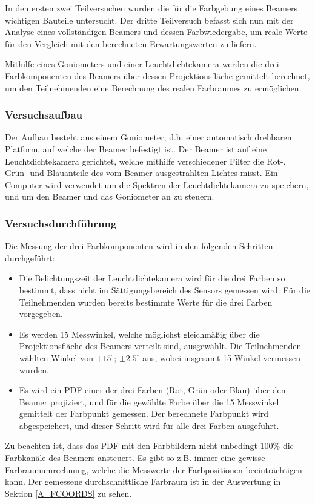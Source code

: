 
In den ersten zwei Teilversuchen wurden die für die Farbgebung eines Beamers wichtigen Bauteile untersucht. Der dritte Teilversuch befasst sich nun mit der Analyse eines vollständigen Beamers und dessen Farbwiedergabe, um reale Werte für den Vergleich mit den berechneten Erwartungswerten zu liefern.

Mithilfe eines Goniometers und einer Leuchtdichtekamera werden die drei Farbkomponenten des Beamers über dessen Projektionsfläche gemittelt berechnet, um den Teilnehmenden eine Berechnung des realen Farbraumes zu ermöglichen.

\subsubsection{Versuchsaufbau}

Der Aufbau besteht aus einem Goniometer, d.h. einer automatisch drehbaren Platform, auf welche der Beamer befestigt ist. Der Beamer ist auf eine Leuchtdichtekamera gerichtet, welche mithilfe verschiedener Filter die Rot-, Grün- und Blauanteile des vom Beamer ausgestrahlten Lichtes misst. Ein Computer wird verwendet um die Spektren der Leuchtdichtekamera zu speichern, und um den Beamer und das Goniometer an zu steuern.

\subsubsection{Versuchsdurchführung}

Die Messung der drei Farbkomponenten wird in den folgenden Schritten durchgeführt:
\begin{itemize}
\item Die Belichtungszeit der Leuchtdichtekamera wird für die drei Farben so bestimmt, dass nicht im Sättigungsbereich des Sensors gemessen wird. Für die Teilnehmenden wurden bereits bestimmte Werte für die drei Farben vorgegeben.
\item Es werden 15 Messwinkel, welche möglichst gleichmäßig über die Projektionsfläche des Beamers verteilt sind, ausgewählt. Die Teilnehmenden wählten Winkel von $+15^\circ$; $\pm2.5^\circ$ aus, wobei insgesamt 15 Winkel vermessen wurden.
\item Es wird ein PDF einer der drei Farben (Rot, Grün oder Blau) über den Beamer projiziert, und für die gewählte Farbe über die 15 Messwinkel gemittelt der Farbpunkt gemessen. Der berechnete Farbpunkt wird abgespeichert, und dieser Schritt wird für alle drei Farben ausgeführt.
\end{itemize}

Zu beachten ist, dass das PDF mit den Farbbildern nicht unbedingt 100\% die Farbkanäle des Beamers ansteuert. Es gibt so z.B. immer eine gewisse Farbraumumrechnung, welche die Messwerte der Farbpositionen beeinträchtigen kann. Der gemessene durchschnittliche Farbraum ist in der Auswertung in Sektion \ref{A_FCOORDS} zu sehen.